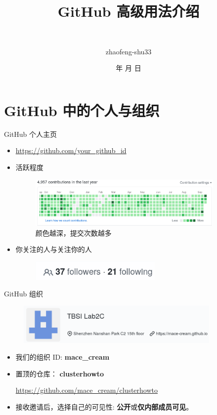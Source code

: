 \documentclass[notheorems,xetex]{beamer}
\title{GitHub 高级用法介绍} %
\author[赵丰]
{\quad {赵丰}\\ \and {zhaofeng-shu33}}
\institute[清华大学] %
{\normalsize\quad
  Lab2c 服务器使用培训
}
\date{\the\year 年 \the\month 月 \the\day 日}
\begin{document}
\frame{\titlepage}
\frame{\tableofcontents}
\section{GitHub 中的个人与组织}
\begin{frame}{GitHub 个人主页}
\begin{itemize}
	\item \url{https://github.com/your_github_id}
	\item 活跃程度
     \begin{figure}
	\includegraphics[height=2.5cm]{activity.png}
	\caption*{颜色越深，提交次数越多}
	\end{figure}
	\item 你关注的人与关注你的人
	\begin{figure}
	\includegraphics[height=1cm]{ff.png}	
	\end{figure}
\end{itemize}
\end{frame}
\begin{frame}{GitHub 组织}
     \begin{figure}
	    \centering
		\includegraphics[height=2cm]{org.png}
	\end{figure}
\begin{itemize}
	\item 我们的组织 ID: \textbf{mace\_cream}
	\item 置顶的仓库： \textbf{clusterhowto}
	
	\url{https://github.com/mace_cream/clusterhowto}
	\item 接收邀请后，选择自己的可见性: \textbf{公开}或\textbf{仅内部成员可见}。
\end{itemize}
\end{frame}
\end{document}
